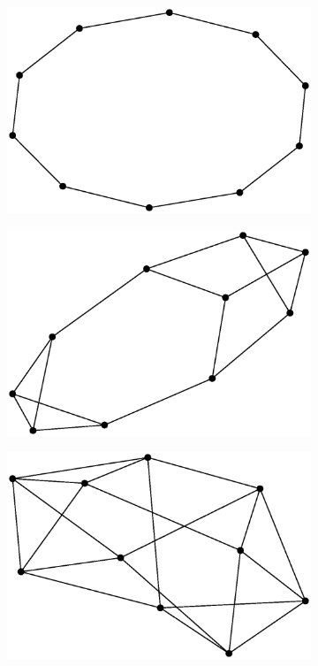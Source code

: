 \begin{figure}[h!]
     \centering
     \begin{subfigure}[b]{0.25\textwidth}
         \includegraphics[width=\columnwidth]{images/rrges-1.eps}
     \end{subfigure}
     \hspace{0.8em}
     \begin{subfigure}[b]{0.25\textwidth}
         \includegraphics[width=\columnwidth]{images/rrges0.eps}
     \end{subfigure}
     \hspace{0.8em}
     \begin{subfigure}[b]{0.25\textwidth}
         \includegraphics[width=\columnwidth]{images/rrges1.eps}

\end{subfigure}
\end{figure}
